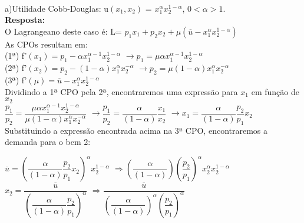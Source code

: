 \begin{enumerate}
\paragraph{}a)Utilidade Cobb-Douglas: u{$(x_1, x_2)$} = {$x^{\alpha}_{1}x^{1-\alpha}_{2}$}, {$0<\alpha>1$}.\\

\textbf{Resposta:}\\


O Lagrangeano deste caso é:
L= {$p_{1}x_{1}+p_{2}x_{2}+ \mu (\overline{u} -x_{1}^{\alpha}x_{2}^{1-\alpha})$}\\


As CPOs resultam em:\\

(1ª) f'{$(x_1) = p_{1} - \alpha x_{1}^{\alpha - 1}x_{2}^{1 - \alpha}$}  {$\rightarrow p_{1} = \mu \alpha x_{1}^{\alpha - 1}x_{2}^{1 - \alpha}$}\\


(2ª) f'{$(x_2) = p_{2} - (1 - \alpha) x_{1}^{\alpha}x_{2}^{- \alpha}$}  {$\rightarrow p_{2} = \mu (1 - \alpha) x_{1}^{\alpha}x_{2}^{- \alpha}$}\\


(3ª) f'{$(\mu) = \overline{u} - x_{1}^{\alpha}x_{2}^{1 - \alpha}$}\\



Dividindo a 1ª CPO pela 2ª, encontraremos uma expressão para {$x_{1}$} em função de {$x_{2}$
}\\

{$\dfrac{p_1}{p_2} = \dfrac{\mu \alpha x_{1}^{\alpha - 1}x_{2}^{1 - \alpha}}{\mu (1 - \alpha) x_{1}^{\alpha}x_{2}^{- \alpha}}$} {$\rightarrow \dfrac{p_1}{p_2} = \dfrac{\alpha}{(1- \alpha)} \dfrac{x_1}{x_2}$} {$\rightarrow x_{1} = \dfrac{\alpha}{(1 - \alpha)}\dfrac{p_2}{p_1} x_{2}$}\\


Substituindo a expressão encontrada acima na 3ª CPO, encontraremos a demanda para o bem 2:

{$\overline{u} = \left(\dfrac{\alpha}{(1 - \alpha)}\dfrac{p_{2}}{p_{1}}x_{2}\right)^{\alpha}x_{2}^{1 - \alpha}$}
{$\Longrightarrow \left(\dfrac{\alpha}{(1 - \alpha)}\right)\left(\dfrac{p_2}{p_1}\right)^{\alpha}x_{2}^{\alpha}x_{2}^{1-\alpha}$}\\


{$x_{2} = \dfrac{\overline{u}}{\left(\dfrac{\alpha}{(1-\alpha)}\dfrac{p_2}{p_1}\right)^{\alpha}}$}
{$\Longrightarrow \dfrac{\overline{u}}{\left(\dfrac{\alpha}{(1-\alpha)}\right)^{\alpha}\left(\dfrac{p_2}{p_1}\right)^{\alpha}}$}\\ 



\end{enumerate}
